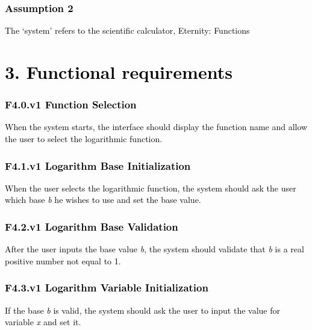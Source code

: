 \documentclass[letterpaper]{article}
\begin{document}
\subsubsection[Assumption 2 ]{\textbf{\textcolor{black}{Assumption 2 }}}
\textcolor{black}{The `system' refers to the scientific calculator, Eternity: Functions}

\section[3. Functional requirements]{\textbf{\textcolor{black}{3. Functional requirements}}}
\subsubsection[F4.0.v1 Function Selection ]{\textbf{\textcolor{black}{F4.0.v1 Function Selection }}}
\textcolor{black}{When the system starts, the interface should display the function name and allow the user to select
the logarithmic function.}

\subsubsection[F4.1.v1 Logarithm Base Initialization ]{\textbf{\textcolor{black}{F4.1.v1 Logarithm Base Initialization
}}}
\textcolor{black}{When the user selects the logarithmic function, the system should ask the user which base
}\textit{\textcolor{black}{b}}\textcolor{black}{ he wishes to use and set the base value.}

\subsubsection[F4.2.v1 Logarithm Base Validation]{\textbf{\textcolor{black}{F4.2.v1 Logarithm Base Validation}}}
\textcolor{black}{After the user inputs the base value }\textit{\textcolor{black}{b}}\textcolor{black}{, the system
should validate that }\textit{\textcolor{black}{b}}\textcolor{black}{ is a real positive number not equal to 1.}

\subsubsection[F4.3.v1 Logarithm Variable Initialization]{\textbf{\textcolor{black}{F4.3.v1 Logarithm Variable
Initialization}}}
\textcolor{black}{If the base }\textit{\textcolor{black}{b}}\textcolor{black}{ is valid, the system should ask the user
to input the value for variable }\textit{\textcolor{black}{x }}\textcolor{black}{and set it.}
\end{document}
